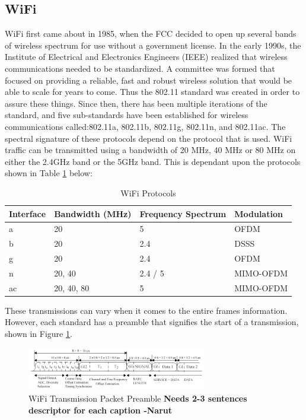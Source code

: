 \subsection{WiFi}
WiFi first came about in 1985, when the FCC decided to open up several bands of wireless spectrum for use without a government license. In the early 1990s, the Institute of Electrical and Electronics Engineers (IEEE) realized that wireless communications needed to be standardized. A committee was formed that focused on providing a reliable, fast and robust wireless solution that would be able to scale for years to come. Thus the 802.11 standard was created in order to assure these things. Since then, there has been multiple iterations of the standard, and five sub-standards have been established for wireless communications called:802.11a, 802.11b, 802.11g, 802.11n, and 802.11ac. The spectral signature of these protocols depend on the protocol that is used. WiFi traffic can be transmitted using a bandwidth of 20 MHz, 40 MHz or 80 MHz on either the 2.4GHz band or the 5GHz band. This is dependant upon the protocols shown in Table \ref{table:wifi_protocols} below:
\begin{table}[ht]
\centering
\caption{WiFi Protocols}
\label{table:wifi_protocols}
\begin{tabular}{|l|l|l|l|}
  Interface & Bandwidth (MHz) & Frequency Spectrum & Modulation \\ \hline
          a &              20 &                  5 &       OFDM \\
          b &              20 &                2.4 &       DSSS \\
          g &              20 &                2.4 &       OFDM \\
          n &          20, 40 &            2.4 / 5 &  MIMO-OFDM \\
         ac &      20, 40, 80 &                  5 &  MIMO-OFDM \\
\end{tabular}
\end{table}\par
These transmissions can vary when it comes to the entire frames information. However, each standard has a preamble that signifies the start of a transmission, shown in Figure \ref{fig:wifi_preamble}.
\begin{figure}[ht]
\centering
\includegraphics[width=0.70\textwidth]{img/ofdm_preamble.jpg}
\caption{WiFi Transmission Packet Preamble \textbf{Needs 2-3 sentences descriptor for each caption -Narut}}
\label{fig:wifi_preamble}
\end{figure}\par
